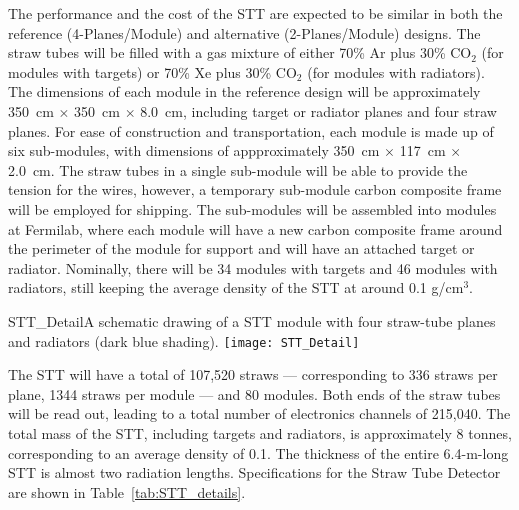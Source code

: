 The performance and the cost of the STT are expected to be similar 
in both the reference (4-Planes/Module) and alternative (2-Planes/Module) designs.
 The straw tubes will be filled with a
gas mixture of either 70\% Ar plus 30\% CO$_2$ (for modules with targets) or
70\% Xe plus 30\% CO$_2$ (for modules with radiators). 
The dimensions of each module in the reference design will
be approximately 350~cm $\times$ 350~cm $\times$ 8.0~cm, including 
target or radiator planes and four straw planes. For ease of construction and
transportation, each module is made up of six sub-modules, with dimensions of
appproximately 350~cm $\times$ 117~cm $\times$ 2.0~cm. 
The straw tubes in a single sub-module will be able to provide the tension 
for the wires, however, a temporary sub-module carbon composite frame will 
be employed for shipping. The sub-modules will be assembled %
into modules 
at Fermilab, where each module will have a new carbon composite frame around 
the perimeter of the module for support and will have an attached target or 
radiator. Nominally, there will be 34 modules with targets and 46 modules 
with radiators, still keeping the 
average density of the STT at around 0.1 g/cm$^3$. 


\begin{cdrfigure}{STT_Detail}{A schematic drawing of a STT module with four straw-tube planes and
radiators (dark blue shading).}
\texttt{[image: STT\_Detail]}
\end{cdrfigure}

The STT will have a total of 107,520 straws  --- corresponding to 336 straws per plane,
1344 straws per module ---
and 80 modules. Both ends of the straw tubes will be read out, leading to a total
number of electronics channels of 215,040. 
The total mass of the STT, including targets and radiators, is approximately 8 
tonnes, corresponding to an average density of 0.1. %
The thickness of the entire 6.4-m-long STT is almost two 
radiation lengths. Specifications for the Straw Tube Detector are shown in Table~\ref{tab:STT_details}.





